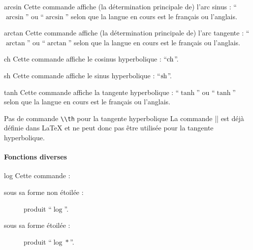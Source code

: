 \begin{docCommand}{arcsin}{}
  Cette commande affiche (la détermination principale de) l'arc sinus :
  \enquote{$\arcsin$} ou
  \enquote{$\arcsin$} selon que
  la langue en cours est le français ou l'anglais.
\end{docCommand}

\begin{docCommand}{arctan}{}
  Cette commande affiche (la détermination principale de) l'arc tangente :
  \enquote{$\arctan$} ou
  \enquote{$\arctan$} selon que
  la langue en cours est le français ou l'anglais.
\end{docCommand}

\begin{docCommand}{ch}{}
  Cette commande affiche le cosinus hyperbolique : \enquote{$\operatorname{ch}$}.
\end{docCommand}

\begin{docCommand}{sh}{}
  Cette commande affiche le sinus hyperbolique : \enquote{$\operatorname{sh}$}.
\end{docCommand}

\begin{docCommand}{tanh}{}
  Cette commande affiche la tangente hyperbolique : \enquote{$\tanh$} ou
  \enquote{$\tanh$} selon que la
  langue en cours est le français ou l'anglais.
  \begin{dbremark}{Pas de commande \protect\lstinline+\\th+ pour la tangente
      hyperbolique}{}
    La commande |\th| est déjà définie dans \LaTeX{} et ne peut donc pas être
    utilisée pour la tangente hyperbolique.
  \end{dbremark}
\end{docCommand}

\paragraph{Fonctions diverses}

\begin{docCommand}{log}{}
  Cette commande :
  \begin{description}
  \item[sous sa forme non étoilée :] produit \enquote{$\log$}.
  \item[sous sa forme étoilée :] produit \enquote{$\log*$}.
  \end{description}
\end{docCommand}

